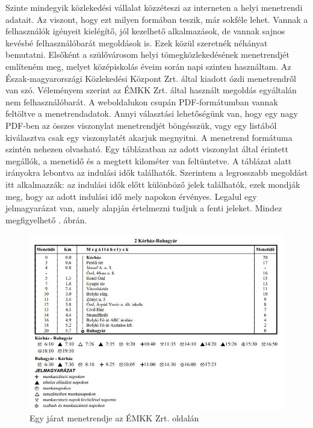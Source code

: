 


Szinte mindegyik közlekedési vállalat közzéteszi az interneten a helyi menetrendi adatait. Az viszont, hogy ezt milyen formában teszik, már sokféle lehet. Vannak a felhasználók igényeit kielégítő, jól kezelhető alkalmazások, de vannak sajnos kevésbé felhasználóbarát megoldások is. Ezek közül szeretnék néhányat bemutatni.
Elsőként a szülővárosom helyi tömegközlekedésének menetrendjét említeném meg, melyet középiskolás éveim során napi szinten használtam. Az Észak-magyarországi Közlekedési Központ Zrt. által kiadott ózdi menetrendről van szó. Véleményem szerint az ÉMKK Zrt. által használt megoldás egyáltalán nem felhasználóbarát. A weboldalukon csupán PDF-formátumban vannak feltöltve a menetrendadatok. Annyi választási lehetőségünk van, hogy egy nagy PDF-ben az összes viszonylat menetrendjét böngésszük, vagy egy listából kiválasztva csak egy viszonylatét akarjuk megnyitni. A menetrend formátuma szintén nehezen olvasható. Egy táblázatban az adott viszonylat által érintett megállók, a menetidő és a megtett kilométer van feltüntetve. A táblázat alatt irányokra lebontva az indulási idők találhatók. Szerintem a legrosszabb megoldást itt alkalmazzák: az indulási idők előtt különböző jelek találhatók, ezek mondják meg, hogy az adott indulási idő mely napokon érvényes. Legalul egy jelmagyarázat van, amely alapján értelmezni tudjuk a fenti jeleket. Mindez megfigyelhető . ábrán.

\begin{figure}[h!]
\centering
\includegraphics[scale=0.7]{kepek/EMKK_menetrend.jpg}
\caption{Egy járat menetrendje az ÉMKK Zrt. oldalán}
\label{fig:EMKK_menetrend}
\end{figure}

